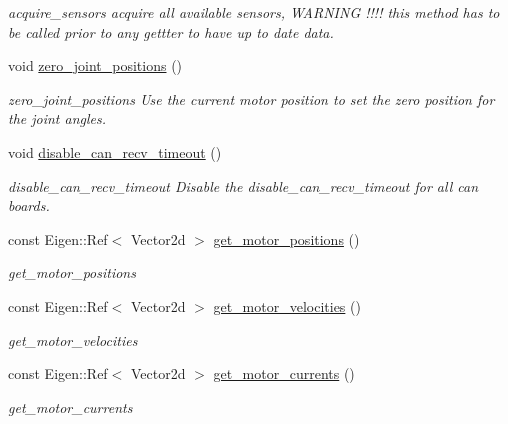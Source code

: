 \begin{DoxyCompactItemize}
\begin{DoxyCompactList}\small\item\em acquire\+\_\+sensors acquire all available sensors, W\+A\+R\+N\+I\+NG !!!! this method has to be called prior to any gettter to have up to date data. \end{DoxyCompactList}\item 
\mbox{\label{classblmc__robots_1_1SingleLeg_a2d95b70a9aca9f7faf503fd5c62f067f}} 
void \hyperlink{classblmc__robots_1_1SingleLeg_a2d95b70a9aca9f7faf503fd5c62f067f}{zero\+\_\+joint\+\_\+positions} ()
\begin{DoxyCompactList}\small\item\em zero\+\_\+joint\+\_\+positions Use the current motor position to set the zero position for the joint angles. \end{DoxyCompactList}\item 
\mbox{\label{classblmc__robots_1_1SingleLeg_a39c69c6578b42df3d556e8a23c3e1861}} 
void \hyperlink{classblmc__robots_1_1SingleLeg_a39c69c6578b42df3d556e8a23c3e1861}{disable\+\_\+can\+\_\+recv\+\_\+timeout} ()
\begin{DoxyCompactList}\small\item\em disable\+\_\+can\+\_\+recv\+\_\+timeout Disable the disable\+\_\+can\+\_\+recv\+\_\+timeout for all can boards. \end{DoxyCompactList}\item 
const Eigen\+::\+Ref$<$ Vector2d $>$ \hyperlink{classblmc__robots_1_1SingleLeg_a52324fdf9779bb82141e2056b222b30f}{get\+\_\+motor\+\_\+positions} ()
\begin{DoxyCompactList}\small\item\em get\+\_\+motor\+\_\+positions \end{DoxyCompactList}\item 
const Eigen\+::\+Ref$<$ Vector2d $>$ \hyperlink{classblmc__robots_1_1SingleLeg_afd9b40fdddedd93e2a92114862846a5e}{get\+\_\+motor\+\_\+velocities} ()
\begin{DoxyCompactList}\small\item\em get\+\_\+motor\+\_\+velocities \end{DoxyCompactList}\item 
const Eigen\+::\+Ref$<$ Vector2d $>$ \hyperlink{classblmc__robots_1_1SingleLeg_a6f9fea8b21a7fb58a95882ec3fe78a8d}{get\+\_\+motor\+\_\+currents} ()
\begin{DoxyCompactList}\small\item\em get\+\_\+motor\+\_\+currents \end{DoxyCompactList}\item 

\end{DoxyCompactItemize}
